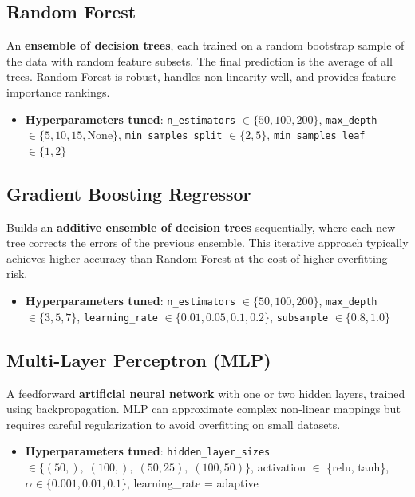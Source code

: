 \subsection{Random Forest}

An \textbf{ensemble of decision trees}, each trained on a random bootstrap sample of the data with random feature subsets. The final prediction is the average of all trees. Random Forest is robust, handles non-linearity well, and provides feature importance rankings.

\begin{itemize}
    \item \textbf{Hyperparameters tuned}: \texttt{n\_estimators} $\in \{50, 100, 200\}$, \texttt{max\_depth} $\in \{5, 10, 15, \text{None}\}$, \texttt{min\_samples\_split} $\in \{2, 5\}$, \texttt{min\_samples\_leaf} $\in \{1, 2\}$
\end{itemize}


\subsection{Gradient Boosting Regressor}

Builds an \textbf{additive ensemble of decision trees} sequentially, where each new tree corrects the errors of the previous ensemble. This iterative approach typically achieves higher accuracy than Random Forest at the cost of higher overfitting risk.

\begin{itemize}
    \item \textbf{Hyperparameters tuned}: \texttt{n\_estimators} $\in \{50, 100, 200\}$, \texttt{max\_depth} $\in \{3, 5, 7\}$, \texttt{learning\_rate} $\in \{0.01, 0.05, 0.1, 0.2\}$, \texttt{subsample} $\in \{0.8, 1.0\}$
\end{itemize}


\subsection{Multi-Layer Perceptron (MLP)}

A feedforward \textbf{artificial neural network} with one or two hidden layers, trained using backpropagation. MLP can approximate complex non-linear mappings but requires careful regularization to avoid overfitting on small datasets.

\begin{itemize}
    \item \textbf{Hyperparameters tuned}: \texttt{hidden\_layer\_sizes} $\in \{(50,),\; (100,),\; (50, 25),\; (100, 50)\}$, activation $\in$ \{relu, tanh\}, $\alpha \in \{0.001, 0.01, 0.1\}$, learning\_rate = adaptive
\end{itemize}


